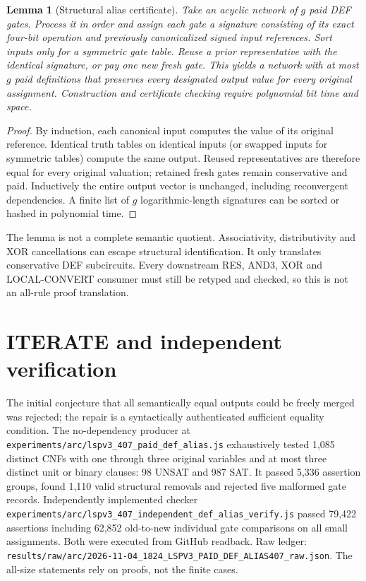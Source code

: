 \documentclass[11pt]{article}
\newtheorem{lemma}[theorem]{Lemma}
\begin{document}
\begin{lemma}[Structural alias certificate]
Take an acyclic network of $g$ paid DEF gates. Process it in order and assign each gate a signature consisting of its exact four-bit operation and previously canonicalized signed input references. Sort inputs only for a symmetric gate table. Reuse a prior representative with the identical signature, or pay one new fresh gate. This yields a network with at most $g$ paid definitions that preserves every designated output value for every original assignment. Construction and certificate checking require polynomial bit time and space.
\end{lemma}
\begin{proof}
By induction, each canonical input computes the value of its original reference. Identical truth tables on identical inputs (or swapped inputs for symmetric tables) compute the same output. Reused representatives are therefore equal for every original valuation; retained fresh gates remain conservative and paid. Inductively the entire output vector is unchanged, including reconvergent dependencies. A finite list of $g$ logarithmic-length signatures can be sorted or hashed in polynomial time.
\end{proof}
The lemma is not a complete semantic quotient. Associativity, distributivity and XOR cancellations can escape structural identification. It only translates conservative DEF subcircuits. Every downstream RES, AND3, XOR and LOCAL-CONVERT consumer must still be retyped and checked, so this is not an all-rule proof translation.

\section*{ITERATE and independent verification}
The initial conjecture that all semantically equal outputs could be freely merged was rejected; the repair is a syntactically authenticated sufficient equality condition. The no-dependency producer at \texttt{experiments/arc/lspv3\_407\_paid\_def\_alias.js} exhaustively tested 1,085 distinct CNFs with one through three original variables and at most three distinct unit or binary clauses: 98 UNSAT and 987 SAT. It passed 5,336 assertion groups, found 1,110 valid structural removals and rejected five malformed gate records. Independently implemented checker \texttt{experiments/arc/lspv3\_407\_independent\_def\_alias\_verify.js} passed 79,422 assertions including 62,852 old-to-new individual gate comparisons on all small assignments. Both were executed from GitHub readback. Raw ledger: \texttt{results/raw/arc/2026-11-04\_1824\_LSPV3\_PAID\_DEF\_ALIAS407\_raw.json}. The all-size statements rely on proofs, not the finite cases.
\end{document}
